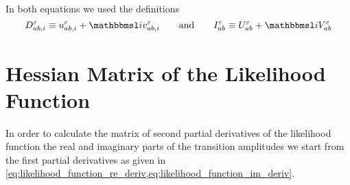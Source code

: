 In both equations we used the definitions
\begin{equation}
  D^\refl_{a b, i} \equiv u^\refl_{a b, i} + \i v^\refl_{a b, i}
  \qquad\text{and}\qquad
  I^\refl_{a b} \equiv U^\refl_{a b} + \i V^\refl_{a b}
\end{equation}


\section{Hessian Matrix of the Likelihood Function}
\label{sec:likelihood_gradient}

In order to calculate the matrix of second partial derivatives of the
likelihood function \wrt the real and imaginary parts of the
transition amplitudes we start from the first partial derivatives as
given in
\cref{eq:likelihood_function_re_deriv,eq:likelihood_function_im_deriv}.

